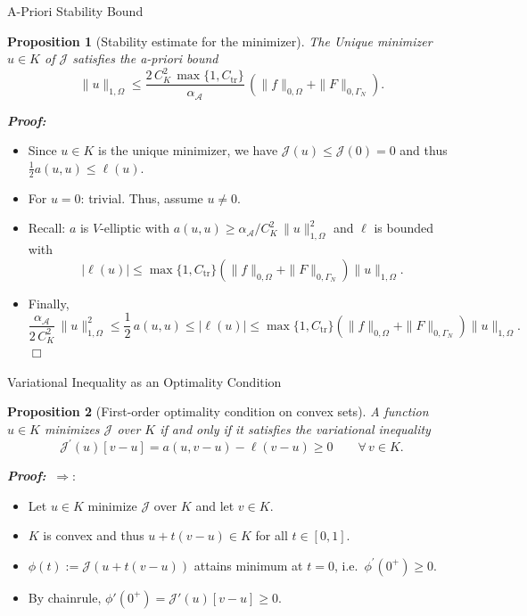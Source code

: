 \documentclass[10pt,aspectratio=169]{beamer}
\newtheorem{proposition}{Proposition}[section]
\def\cA{{\mathcal A}}
\def\cJ{{\mathcal J}}
\def\eop{\hfill{$\Box$}}
\begin{document}
\begin{frame}{A-Priori Stability Bound}
	\begin{proposition}[Stability estimate for the minimizer]
		The Unique minimizer $u\in K$ of $\cJ$ satisfies the a-priori bound
		\begin{equation*}
			\|u\|_{1,\Omega} \le \frac{2\,C_K^2\,\max\{1,C_\mathrm{tr}\}}{\alpha_\cA}\,\left(\|f\|_{0,\Omega} +\|F\|_{0,\Gamma_N}\right).
		\end{equation*}
	\end{proposition}
	\textbf{\em Proof:}
	\begin{itemize}
		\item Since $u\in K$ is the unique minimizer, we have $\cJ(u)\le\cJ(0) = 0$ and thus $\tfrac12a(u,u)\le \ell(u)$.
		\item For $u = 0$: trivial. Thus, assume $u\neq 0$.
		\item Recall: $a$ is $V$-elliptic with $a(u,u)\ge \alpha_\cA/C_K^2\,\|u\|_{1,\Omega}^2$ and $\ell$ is bounded with
		      \begin{equation*}
			      |\ell(u)|\le  \max\{1,C_{\mathrm{tr}}\}\left(\|f\|_{0,\Omega} +\|F\|_{0,\Gamma_N}\right)\|u\|_{1,\Omega}.
		      \end{equation*}
		\item Finally,
		      \begin{equation*}
			      \frac{\alpha_\cA}{2\,C_K^2}\,\|u\|_{1,\Omega}^2\le \frac{1}{2}\,a(u,u)\le |\ell(u)|\le  \max\{1,C_{\mathrm{tr}}\}\left(\|f\|_{0,\Omega} +\|F\|_{0,\Gamma_N}\right)\|u\|_{1,\Omega}.
		      \end{equation*}\eop
	\end{itemize}
\end{frame}

\begin{frame}{Variational Inequality as an Optimality Condition}
	\begin{proposition}[First-order optimality condition on convex sets]
		A function $u\in K$ minimizes $\cJ$ over $K$ if and only if it satisfies the variational inequality
		\begin{equation*}
			\cJ^\prime(u)[v-u] =  a(u,v-u)-\ell(v-u) \ge 0\qquad\forall\, v\in K.
		\end{equation*}
	\end{proposition}
	\textbf{\em Proof:} $\ \Longrightarrow:$
	\begin{itemize}
		\item Let $u\in K$ minimize $\cJ$ over $K$ and let $v\in K$.
		\item $K$ is convex and thus $u+t(v-u)\in K$ for all $t\in[0,1]$.
		\item $\phi(t):= \cJ(u+t(v-u))$ attains minimum at $t = 0$, i.e.\ $\phi^\prime(0^+)\ge 0$.
		\item By chainrule, $\phi'(0^+)=\cJ'(u)[v-u]\ge 0$.
	\end{itemize}
\end{frame}
\end{document}
